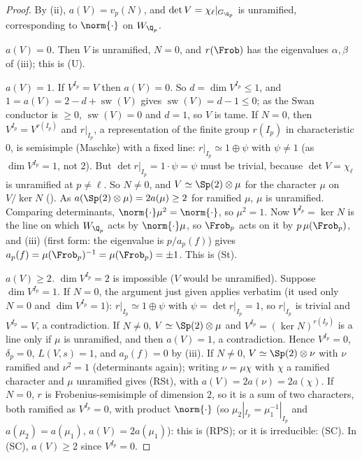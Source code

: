 \begin{proof}
By (ii), $a(V)=v_p(N)$, and $\det V=\chi_\ell|_{G_{\Q_p}}$ is unramified, corresponding to $\norm{\cdot}$ on $W_{\Q_p}$.

\emph{$a(V)=0$.} Then $V$ is unramified, $N=0$, and $r(\Frob)$ has the eigenvalues $\alpha,\beta$ of (iii); this is (U).

\emph{$a(V)=1$.} If $V^{I_p}=V$ then $a(V)=0$. So $d=\dim V^{I_p}\le1$, and $1=a(V)=2-d+\operatorname{sw}(V)$ gives $\operatorname{sw}(V)=d-1\le0$; as the Swan conductor is $\ge0$, $\operatorname{sw}(V)=0$ and
$d=1$, so $V$ is tame. If $N=0$, then $V^{I_p}=V^{r(I_p)}$ and $r|_{I_p}$, a representation of the finite group $r(I_p)$ in characteristic $0$, is semisimple (Maschke) with
a fixed line: $r|_{I_p}\simeq1\oplus\psi$ with $\psi\ne1$ (as $\dim V^{I_p}=1$, not $2$).
But $\det r|_{I_p}=1\cdot\psi=\psi$ must be trivial, because $\det V=\chi_\ell$ is unramified at $p\ne\ell$. So $N\ne0$, and $V\simeq\Sp(2)\otimes\mu$ for the character $\mu$ on $V/\ker N$
(). As $a(\Sp(2)\otimes\mu)=2a(\mu)\ge2$ for ramified $\mu$, $\mu$ is unramified. Comparing determinants, $\norm{\cdot}\mu^2=\norm{\cdot}$, so $\mu^2=1$. Now
$V^{I_p}=\ker N$ is the line on which $W_{\Q_p}$ acts by $\norm{\cdot}\mu$, so $\Frob_p$ acts on it by $p\,\mu(\Frob_p)$, and (iii) (first form:
the eigenvalue is $p/a_p(f)$) gives $a_p(f)=\mu(\Frob_p)^{-1}=\mu(\Frob_p)=\pm1$. This is (St).

\emph{$a(V)\ge2$.} $\dim V^{I_p}=2$ is impossible ($V$ would be unramified). Suppose $\dim V^{I_p}=1$. If $N=0$, the argument just given applies verbatim (it used
only $N=0$ and $\dim V^{I_p}=1$): $r|_{I_p}\simeq1\oplus\psi$ with $\psi=\det r|_{I_p}=1$, so $r|_{I_p}$ is trivial and $V^{I_p}=V$, a contradiction. If $N\ne0$, $V\simeq\Sp(2)\otimes\mu$ and $V^{I_p}=(\ker N)^{r(I_p)}$ is a line only if $\mu$ is unramified,
and then $a(V)=1$, a contradiction. Hence $V^{I_p}=0$, $\delta_p=0$, $L(V,s)=1$, and $a_p(f)=0$ by (iii). If $N\ne0$,
$V\simeq\Sp(2)\otimes\nu$ with $\nu$ ramified and $\nu^2=1$ (determinants again); writing $\nu=\mu\chi$ with $\chi$ a ramified character and $\mu$ unramified gives (RSt), with
$a(V)=2a(\nu)=2a(\chi)$. If $N=0$, $r$ is Frobenius-semisimple of dimension $2$, so it is a sum of two characters, both ramified as $V^{I_p}=0$, with product
$\norm{\cdot}$ (so $\mu_2|_{I_p}=\mu_1^{-1}|_{I_p}$ and $a(\mu_2)=a(\mu_1)$, $a(V)=2a(\mu_1)$): this is (RPS); or it is irreducible: (SC). In (SC), $a(V)\ge2$ since $V^{I_p}=0$.


\end{proof}
